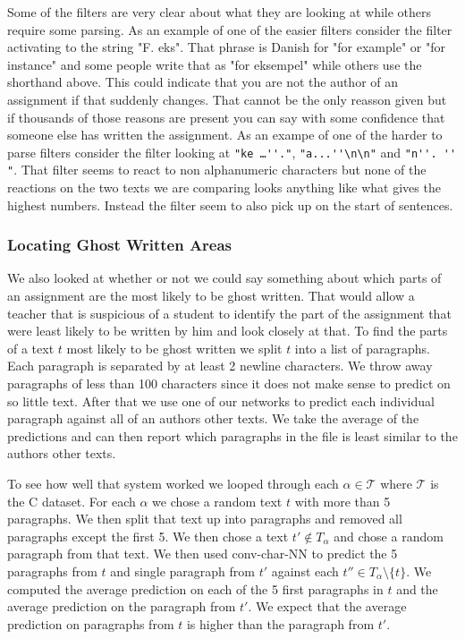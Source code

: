 Some of the filters are very clear about what they are looking at while others
require some parsing. As an example of one of the easier filters consider
the filter activating to the string "F. eks". That phrase is Danish for "for
example" or "for instance" and some people write that as "for eksempel" while
others use the shorthand above. This could indicate that you are not the author
of an assignment if that suddenly changes. That cannot be the only reasson
given but if thousands of those reasons are present you can say with some
confidence that someone else has written the assignment. As an exampe of one of
the harder to parse filters consider the filter looking at \verb["ke …''."[,
\verb["a...''\n\n"[ and \verb["n''. '' "[. That filter seems to react to non
alphanumeric characters but none of the reactions on the two texts we are
comparing looks anything like what gives the highest numbers. Instead the filter
seem to also pick up on the start of sentences.


\subsubsection{Locating Ghost Written Areas}
\label{subsubsec:ghost_written_areas}

We also looked at whether or not we could say something about which parts of an
assignment are the most likely to be ghost written. That would allow a teacher
that is suspicious of a student to identify the part of the assignment that
were least likely to be written by him and look closely at that. To find the
parts of a text $t$ most likely to be ghost written we split $t$ into a list of
paragraphs. Each paragraph is separated by at least 2 newline characters. We
throw away paragraphs of less than 100 characters since it does not make sense
to predict on so little text. After that we use one of our networks to predict
each individual paragraph against all of an authors other texts. We take the
average of the predictions and can then report which paragraphs in the file is
least similar to the authors other texts.

To see how well that system worked we looped through each $\alpha \in
\mathcal{T}$ where $\mathcal{T}$ is the \gls{C} dataset. For each $\alpha$ we
chose a random text $t$ with more than 5 paragraphs. We then split that text up
into paragraphs and removed all paragraphs except the first 5. We then chose
a text $t' \not\in T_\alpha$ and chose a random paragraph from that text. We
then used \gls{conv-char-NN} to predict the 5 paragraphs from $t$ and single
paragraph from $t'$ against each $t'' \in T_\alpha \setminus \{t\}$. We computed
the average prediction on each of the 5 first paragraphs in $t$ and the average
prediction on the paragraph from $t'$. We expect that the average prediction on
paragraphs from $t$ is higher than the paragraph from $t'$.

